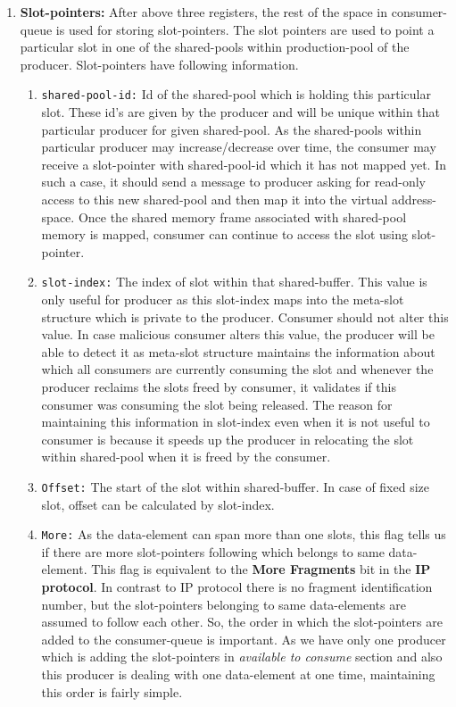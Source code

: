 \documentclass[a4paper,twoside]{report} %
\begin{document}
\begin{enumerate}
  \item \textbf{Slot-pointers:} After above three registers, the rest
  of the space in consumer-queue is used for storing slot-pointers.
  The slot pointers are used to point a particular slot in one of the
  shared-pools within production-pool of the producer.  
  Slot-pointers have following information.
  \begin{enumerate}
    \item \texttt{shared-pool-id:} Id of the shared-pool which is
    holding this particular slot.  These id's are given by the
    producer and will be unique within that particular producer for given
    shared-pool.  As the shared-pools within particular
    producer may increase/decrease over time, the consumer may receive
    a slot-pointer with shared-pool-id which it has not mapped yet.
    In such a case, it should send a message to producer asking for
    read-only access to this new shared-pool and then map it into
    the virtual address-space.  Once the shared memory frame
    associated with shared-pool memory is mapped, consumer can 
    continue to access the slot using slot-pointer.
    \item \texttt{slot-index:}  The index of slot within that
    shared-buffer.  This value is only useful for producer as this
    slot-index maps into the meta-slot structure which is private to
    the producer.  Consumer should not alter this value.  In case
    malicious consumer alters this value, the producer will be able
    to detect it as meta-slot structure maintains the information
    about which all consumers are currently consuming the slot and
    whenever the producer reclaims the slots freed by consumer, it
    validates if this consumer was consuming the slot being released.
    The reason for maintaining this information in slot-index even
    when it is not useful to consumer is because it speeds up the
    producer in relocating the slot within shared-pool when it is
    freed by the consumer.  
    \item \texttt{Offset:} The start of the slot within shared-buffer.
    In case of fixed size slot, offset can be calculated by
    slot-index.
    \item \texttt{More:} As the data-element can span more than one
    slots, this flag tells us if there are more slot-pointers 
    following which belongs to same data-element.  This flag is
    equivalent to the \textbf{More Fragments} bit in the \textbf{IP
    protocol}.  In contrast to IP protocol there is no fragment
    identification number, but the slot-pointers belonging to same
    data-elements are assumed to follow each other.  So, the order in
    which the slot-pointers are added to the consumer-queue is
    important.  As we have only one producer which is adding the
    slot-pointers in \textit{available to consume} section and also
    this producer is dealing with one data-element at one time,
    maintaining this order is fairly simple.
  \end{enumerate} 

\end{enumerate} 
\end{document}
